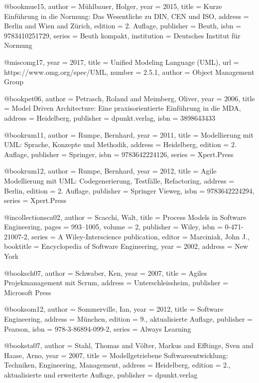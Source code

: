 @book{mue15,
 author = {M{\"u}hlbauer, Holger},
 year = {2015},
 title = {Kurze Einf{\"u}hrung in die Normung: Das Wesentliche zu DIN, CEN und ISO},
 address = {Berlin and Wien and Z{\"u}rich},
 edition = {2. Auflage},
 publisher = {Beuth},
 isbn = {9783410251729},
 series = {Beuth kompakt},
 institution = {{Deutsches Institut f{\"u}r Normung}}
}


@misc{omg17,
 year = {2017},
 title = {Unified Modeling Language (UML)},
 url = {https://www.omg.org/spec/UML},
 number = {2.5.1},
 author = {{Object Management Group}}
}


@book{pet06,
 author = {Petrasch, Roland and Meimberg, Oliver},
 year = {2006},
 title = {Model Driven Architecture: Eine praxisorientierte Einf{\"u}hrung in die MDA},
 address = {Heidelberg},
 publisher = {dpunkt.verlag},
 isbn = {3898643433}
}


@book{rum11,
 author = {Rumpe, Bernhard},
 year = {2011},
 title = {Modellierung mit UML: Sprache, Konzepte und Methodik},
 address = {Heidelberg},
 edition = {2. Auflage},
 publisher = {Springer},
 isbn = {9783642224126},
 series = {Xpert.Press}
}


@book{rum12,
 author = {Rumpe, Bernhard},
 year = {2012},
 title = {Agile Modellierung mit UML: Codegenerierung, Testf{\"a}lle, Refactoring},
 address = {Berlin},
 edition = {2. Auflage},
 publisher = {{Springer Vieweg}},
 isbn = {9783642224294},
 series = {Xpert.Press}
}


@incollection{sca02,
 author = {Scacchi, Walt},
 title = {Process Models in Software Engineering},
 pages = {993--1005},
 volume = {2},
 publisher = {Wiley},
 isbn = {0-471-21007-2},
 series = {A Wiley-Interscience publication},
 editor = {Marciniak, John J.},
 booktitle = {Encyclopedia of Software Engineering},
 year = {2002},
 address = {New York}
}


@book{sch07,
 author = {Schwaber, Ken},
 year = {2007},
 title = {Agiles Projekmanagement mit Scrum},
 address = {Unterschleissheim},
 publisher = {{Microsoft Press}}
}


@book{som12,
 author = {Sommerville, Ian},
 year = {2012},
 title = {Software Engineering},
 address = {M{\"u}nchen},
 edition = {9., aktualisierte Auflage},
 publisher = {Pearson},
 isbn = {978-3-86894-099-2},
 series = {Always Learning}
}


@book{sta07,
 author = {Stahl, Thomas and V{\"o}lter, Markus and Efftinge, Sven and Haase, Arno},
 year = {2007},
 title = {Modellgetriebene Softwareentwicklung: Techniken, Engineering, Management},
 address = {Heidelberg},
 edition = {2., aktualisierte und erweiterte Auflage},
 publisher = {dpunkt.verlag}
}


